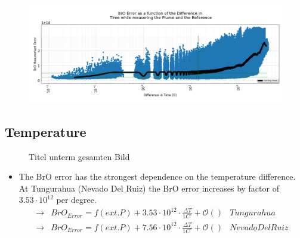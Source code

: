 \documentclass  [
  paper    = a4,
  BCOR     = 10mm,
  twoside,
  fontsize = 12pt,
  fleqn,
  toc      = bibnumbered,
  toc      = listofnumbered,
  numbers  = noendperiod,
  headings = normal,
  listof   = leveldown,
  version  = 3.03
]                                       {scrreprt}
\begin{document}
	\begin{figure}[h!]
		\includegraphics[width=1.1\linewidth]{Bilder/Datum}
		\caption{}
		\label{fig:dat}
	\end{figure}

	\subsection{Temperature}
	\begin{figure}[h!]			
		\caption{Titel unterm gesamten Bild}
	\end{figure}
	\begin{itemize}
		\item The BrO error has the strongest dependence on the temperature difference. At Tungurahua (Nevado Del Ruiz) the BrO error increases by factor of $3.53\cdot10^{12}$  per degree.
		\begin{align*}
		\rightarrow&  BrO_{Error} = f(ext. P)+ 3.53\cdot10^{12}\cdot\frac{\Delta T}{1C^{\circ}} + \mathcal{O}\left(\right) & Tungurahua\\
		\rightarrow&  BrO_{Error} = f(ext. P)+7.56\cdot10^{12}\cdot\frac{\Delta T}{1C^{\circ}} + \mathcal{O}\left(\right) & Nevado Del Ruiz\\
		\end{align*}
	\end{itemize}
\end{document}
